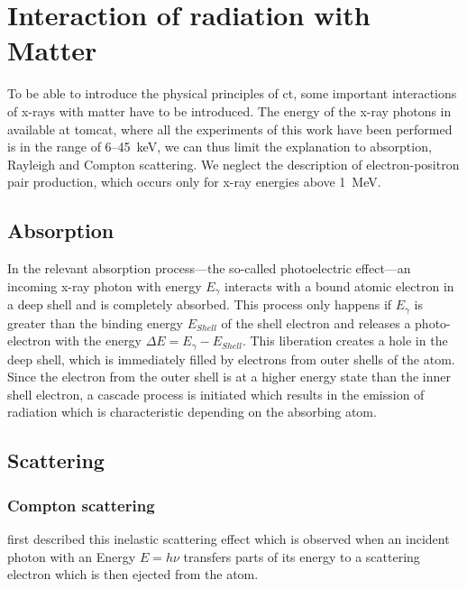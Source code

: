 \section{Interaction of radiation with Matter}
To be able to introduce the physical principles of \ac{ct}, some important interactions of x-rays with matter have to be introduced. The energy of the x-ray photons in available at \ac{tomcat}, where all the experiments of this work have been performed is in the range of 6--\SI{45}{\kilo\electronvolt}, we can thus limit the explanation to absorption, Rayleigh and Compton scattering. We neglect the description of electron-positron pair production, which occurs only for x-ray energies above \SI{1}{\mega\electronvolt}.

\subsection{Absorption}\label{sec:absorption}
In the relevant absorption process---the so-called photoelectric effect---an incoming x-ray photon with energy $E_{\gamma}$ interacts with a bound atomic electron in a deep shell and is completely absorbed. This process only happens if $E_{\gamma}$ is greater than the binding energy $E_{Shell}$ of the shell electron and releases a photo-electron with the energy $\Delta E=E_{\gamma}-E_{Shell}$. This liberation creates a hole in the deep shell, which is immediately filled by electrons from outer shells of the atom. Since the electron from the outer shell is at a higher energy state than the inner shell electron, a cascade process is initiated which results in the emission of radiation which is characteristic depending on the absorbing atom.

\subsection{Scattering}
\subsubsection{Compton scattering}
\citet{Compton1923} first described this inelastic scattering effect which is observed when an incident photon with an Energy $E=h\nu$ transfers parts of its energy to a scattering electron which is then ejected from the atom. 

